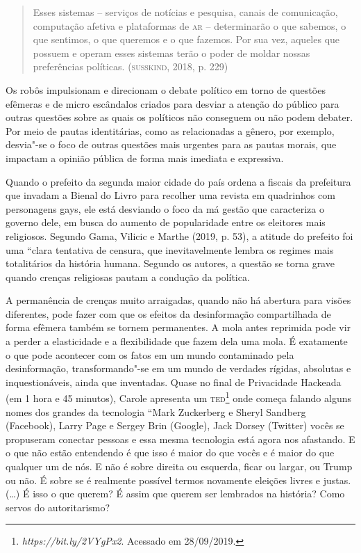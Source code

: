 \begin{quote}
Esses sistemas -- serviços de notícias e pesquisa, canais de
comunicação, computação afetiva e plataformas de \textsc{ar} -- determinarão o
que sabemos, o que sentimos, o que queremos e o que fazemos. Por sua
vez, aqueles que possuem e operam esses sistemas terão o poder de moldar
nossas preferências políticas. (\textsc{susskind}, 2018, p. 229)
\end{quote}

Os robôs impulsionam e direcionam o debate político em torno de questões
efêmeras e de micro escândalos criados para desviar a atenção do público
para outras questões sobre as quais os políticos não conseguem ou não
podem debater. Por meio de pautas identitárias, como as relacionadas a
gênero, por exemplo, desvia"-se o foco de outras questões mais urgentes
para as pautas morais, que impactam a opinião pública de forma mais
imediata e expressiva.

Quando o prefeito da segunda maior cidade do país ordena a fiscais da
prefeitura que invadam a Bienal do Livro para recolher uma revista em
quadrinhos com personagens gays, ele está desviando o foco da má gestão
que caracteriza o governo dele, em busca do aumento de popularidade
entre os eleitores mais religiosos. Segundo Gama, Vilicic e Marthe
(2019, p. 53), a atitude do prefeito foi uma ``clara tentativa de
censura, que inevitavelmente lembra os regimes mais totalitários da
história humana. Segundo os autores, a questão se torna grave quando
crenças religiosas pautam a condução da política.

A permanência de crenças muito arraigadas, quando não há abertura para
visões diferentes, pode fazer com que os efeitos da desinformação
compartilhada de forma efêmera também se tornem permanentes. A mola
antes reprimida pode vir a perder a elasticidade e a flexibilidade que
fazem dela uma mola. É exatamente o que pode acontecer com os fatos em
um mundo contaminado pela desinformação, transformando"-se em um mundo de
verdades rígidas, absolutas e inquestionáveis, ainda que inventadas.
Quase no final de Privacidade Hackeada (em 1 hora e 45 minutos), Carole
apresenta um \textsc{ted}\footnote{\emph{https://bit.ly/2VYgPx2}.
  Acessado em 28/09/2019.} onde começa falando alguns nomes dos grandes
da tecnologia ``Mark Zuckerberg e Sheryl Sandberg (Facebook), Larry Page
e Sergey Brin (Google), Jack Dorsey (Twitter) vocês se propuseram
conectar pessoas e essa mesma tecnologia está agora nos afastando. E o
que não estão entendendo é que isso é maior do que vocês e é maior do
que qualquer um de nós. E não é sobre direita ou esquerda, ficar ou
largar, ou Trump ou não. É sobre se é realmente possível termos
novamente eleições livres e justas. (\ldots{}) É isso o que querem? É assim
que querem ser lembrados na história? Como servos do autoritarismo?

